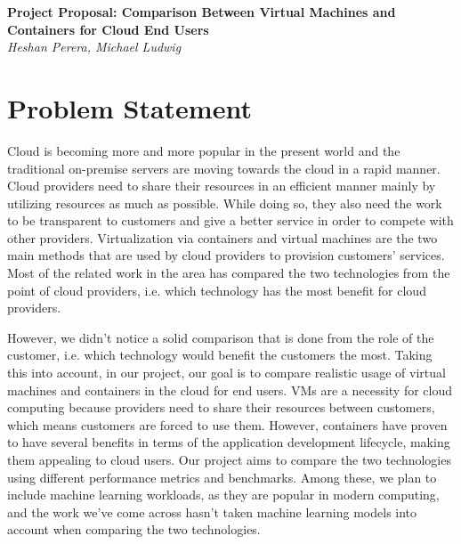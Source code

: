 \documentclass[11pt]{article}
\begin{document}
\renewcommand{\headrulewidth}{0pt} 
\renewcommand{\footrulewidth}{0pt} 
\pagestyle{fancy}
\cfoot{}
\lhead{}
\rhead{}
\lfoot{\itshape\textcolor{gray}{CS525T Cloud Computing Paper Review}}

\begin{center}
{\LARGE \bf Project Proposal: Comparison Between Virtual Machines and Containers for Cloud End Users} \\
{\normalsize \emph{Heshan Perera, Michael Ludwig}}\\

\end{center}

\section{Problem Statement}


Cloud is becoming more and more popular in the present world and the traditional on-premise servers are moving towards the cloud in a rapid manner. Cloud providers need to share their resources in an efficient manner mainly by utilizing resources as much as possible. While doing so, they also need the work to be transparent to customers and give a better service in order to compete with other providers. Virtualization via containers and virtual machines are the two main methods that are used by cloud providers to provision customers' services. Most of the related work in the area has compared the two technologies from the point of cloud providers, i.e. which technology has the most benefit for cloud providers.

However, we didn't notice a solid comparison that is done from the role of the customer, i.e. which technology would benefit the customers the most. Taking this into account, in our project, our goal is to compare realistic usage of virtual machines and containers in the cloud for end users. VMs are a necessity for cloud computing because providers need to share their resources between customers, which means customers are forced to use them. However, containers have proven to have several benefits in terms of the application development lifecycle, making them appealing to cloud users. Our project aims to compare the two technologies using different performance metrics and benchmarks. Among these, we plan to include machine learning workloads, as they are popular in modern computing, and the work we've come across hasn't taken machine learning models into account when comparing the two technologies.
\end{document}
